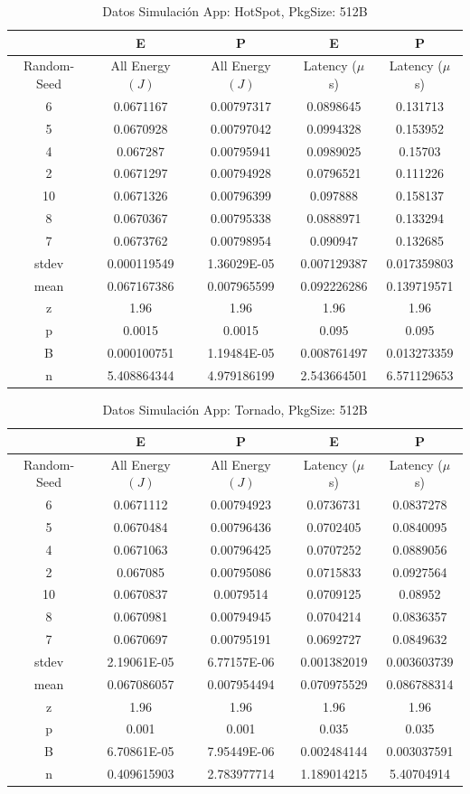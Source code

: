 \begin{table}[H]
\centering
\begin{tabular}{|c|c|c|c|c|}
\hline
 &E&P&E&P\\
\hline
Random-Seed&All Energy $(J)$&All Energy $(J)$&Latency ($\mu$ s)&Latency ($\mu$ s)\\
\hline
6&0.0671167&0.00797317&0.0898645&0.131713\\
5&0.0670928&0.00797042&0.0994328&0.153952\\
4&0.067287&0.00795941&0.0989025&0.15703\\
2&0.0671297&0.00794928&0.0796521&0.111226\\
10&0.0671326&0.00796399&0.097888&0.158137\\
8&0.0670367&0.00795338&0.0888971&0.133294\\
7&0.0673762&0.00798954&0.090947&0.132685\\
\hline
stdev&0.000119549&1.36029E-05&0.007129387&0.017359803\\
mean&0.067167386&0.007965599&0.092226286&0.139719571\\
z&1.96&1.96&1.96&1.96\\
p&0.0015&0.0015&0.095&0.095\\
B&0.000100751&1.19484E-05&0.008761497&0.013273359\\
\hline
n&5.408864344&4.979186199&2.543664501&6.571129653\\
\hline
\end{tabular}
\caption{Datos Simulación App: HotSpot, PkgSize: 512B}
\label{tb:sh512}
\end{table}

\begin{table}[H]
\centering
\begin{tabular}{|c|c|c|c|c|}
\hline
 &E&P&E&P\\
\hline
Random-Seed&All Energy $(J)$&All Energy $(J)$&Latency ($\mu$ s)&Latency ($\mu$ s)\\
\hline
6&0.0671112&0.00794923&0.0736731&0.0837278\\
5&0.0670484&0.00796436&0.0702405&0.0840095\\
4&0.0671063&0.00796425&0.0707252&0.0889056\\
2&0.067085&0.00795086&0.0715833&0.0927564\\
10&0.0670837&0.0079514&0.0709125&0.08952\\
8&0.0670981&0.00794945&0.0704214&0.0836357\\
7&0.0670697&0.00795191&0.0692727&0.0849632\\
\hline
stdev&2.19061E-05&6.77157E-06&0.001382019&0.003603739\\
mean&0.067086057&0.007954494&0.070975529&0.086788314\\
z&1.96&1.96&1.96&1.96\\
p&0.001&0.001&0.035&0.035\\
B&6.70861E-05&7.95449E-06&0.002484144&0.003037591\\
\hline
n&0.409615903&2.783977714&1.189014215&5.40704914\\
\hline
\end{tabular}
\caption{Datos Simulación App: Tornado, PkgSize: 512B}
\label{tb:st512}
\end{table}


